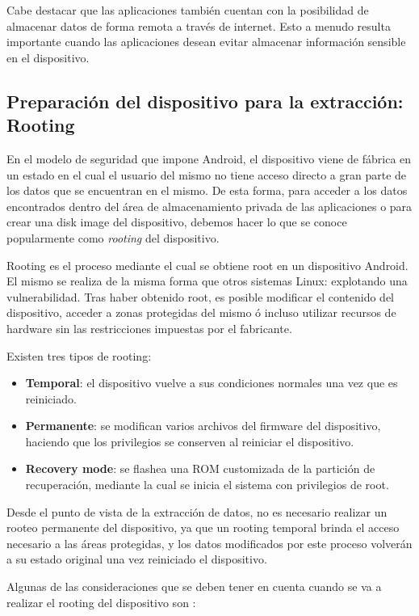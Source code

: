 Cabe destacar que las aplicaciones también cuentan con la posibilidad de almacenar datos de forma remota a través de internet. Esto a menudo resulta importante cuando las aplicaciones desean evitar almacenar información sensible en el dispositivo.

\subsection{Preparación del dispositivo para la extracción: Rooting}
En el modelo de seguridad que impone Android, el dispositivo viene de fábrica en un estado en el cual el usuario del mismo no tiene acceso directo a gran parte de los datos que se encuentran en el mismo. De esta forma, para acceder a los datos encontrados dentro del área de almacenamiento privada de las aplicaciones o para crear una disk image del dispositivo, debemos hacer lo que se conoce popularmente como \emph{rooting} del dispositivo.

Rooting es el proceso mediante el cual se obtiene root en un dispositivo Android. El mismo se realiza de la misma forma que otros sistemas Linux: explotando una vulnerabilidad. Tras haber obtenido root, es posible modificar el contenido del dispositivo, acceder a zonas protegidas del mismo ó incluso utilizar recursos de hardware sin las restricciones impuestas por el fabricante.

Existen tres tipos de rooting:
\begin{itemize}
\item \textbf{Temporal}: el dispositivo vuelve a sus condiciones normales una vez que es reiniciado.
\item \textbf{Permanente}: se modifican varios archivos del firmware del dispositivo, haciendo que los privilegios se conserven al reiniciar el dispositivo.
\item \textbf{Recovery mode}: se flashea una ROM customizada de la partición de recuperación, mediante la cual se inicia el sistema con privilegios de root.
\end{itemize}

Desde el punto de vista de la extracción de datos, no es necesario realizar un rooteo permanente del dispositivo, ya que un rooting temporal brinda el acceso necesario a las áreas protegidas, y los datos modificados por este proceso volverán a su estado original una vez reiniciado el dispositivo.

Algunas de las consideraciones que se deben tener en cuenta cuando se va a realizar el rooting del dispositivo son \cite{collectmethod}:

